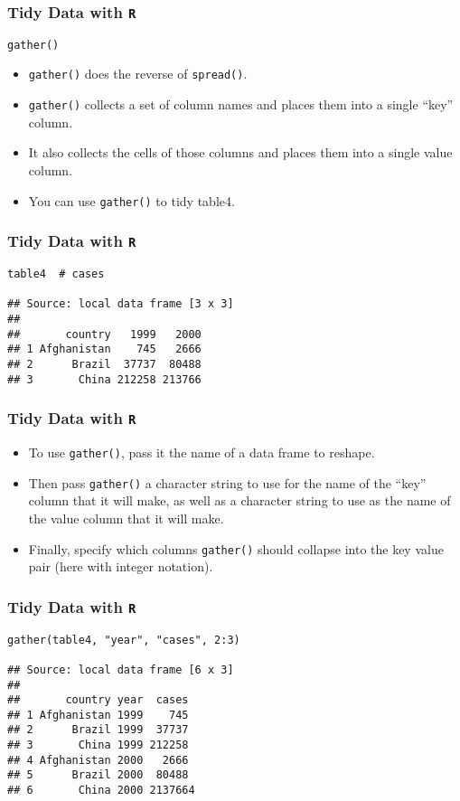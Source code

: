 \documentclass[TIDYMASTER.tex]{subfiles}
\begin{document}
 
	
\begin{frame}[fragile]
	\frametitle{Tidy Data with \texttt{R}}
	\Large
\texttt{gather()}
\begin{itemize}
\item \texttt{gather()} does the reverse of \texttt{spread()}. 
\item \texttt{gather()} collects a set of column names and places them into a single “key” column. 
\item It also collects the cells of those columns and places them into a single value column.
\item You can use \texttt{gather()} to tidy table4.
\end{itemize}

\end{frame}
\begin{frame}[fragile]
	\frametitle{Tidy Data with \texttt{R}}
	\Large
\begin{verbatim}
table4  # cases

## Source: local data frame [3 x 3]
## 
##       country   1999   2000
## 1 Afghanistan    745   2666
## 2      Brazil  37737  80488
## 3       China 212258 213766
\end{verbatim}
\end{frame}
\begin{frame}[fragile]
	\frametitle{Tidy Data with \texttt{R}}
	\Large
\begin{itemize}
\item To use \texttt{gather()}, pass it the name of a data frame to reshape. 
\item Then pass \texttt{gather()} a character string to use for the name of the “key” column that it will make, as well as a character string to use as the name of the value column that it will make. 
\item Finally, specify which columns \texttt{gather()} should collapse into the key value pair (here with integer notation).
\end{itemize}

\end{frame}
\begin{frame}[fragile]
	\frametitle{Tidy Data with \texttt{R}}
	\Large
\begin{verbatim}
gather(table4, "year", "cases", 2:3)

## Source: local data frame [6 x 3]
## 
##       country year  cases
## 1 Afghanistan 1999    745
## 2      Brazil 1999  37737
## 3       China 1999 212258
## 4 Afghanistan 2000   2666
## 5      Brazil 2000  80488
## 6       China 2000 2137664
\end{verbatim}

\end{frame}
\end{document}
